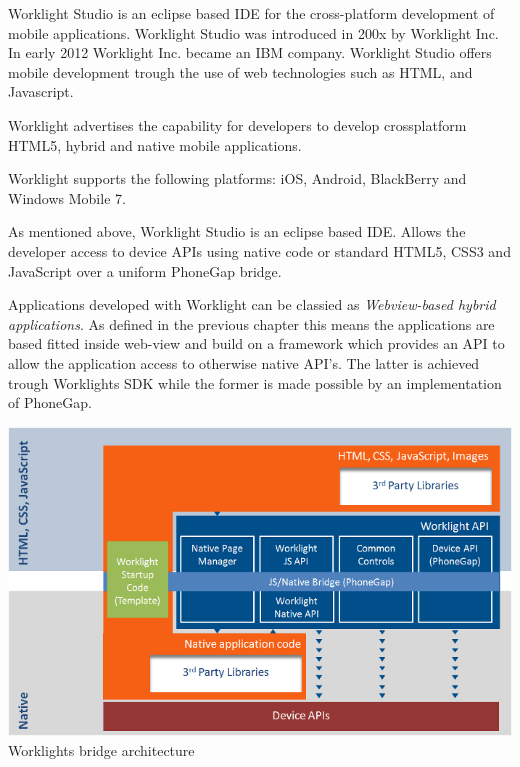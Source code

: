 \pagebreak

Worklight Studio is an eclipse based IDE for the cross-platform development of mobile applications. Worklight Studio was introduced in 200x by Worklight Inc. In early 2012 Worklight Inc. became an IBM company. Worklight Studio offers mobile development trough the use of web technologies such as HTML, and Javascript.

Worklight advertises the capability for developers to develop crossplatform HTML5, hybrid and native mobile applications.


Worklight supports the following platforms: iOS, Android, BlackBerry and Windows Mobile 7.

As mentioned above, Worklight Studio is an eclipse based IDE.
Allows the developer access to device APIs using native code or standard HTML5, CSS3 and JavaScript over a uniform PhoneGap bridge.


Applications developed with Worklight can be classied as \emph{Webview-based hybrid applications}. As defined in the previous chapter this means the applications are based fitted inside web-view and build on a framework which provides an API to allow the application access to otherwise native API's. The latter is achieved trough Worklights SDK while the former is made possible by an implementation of PhoneGap. \cite{Inc2012}

\begin{centering}
  \includegraphics[scale=0.5]{images/Worklight_architecture.png}\\{Worklights bridge architecture\cite{Inc2012a}}\\
\end{centering}

